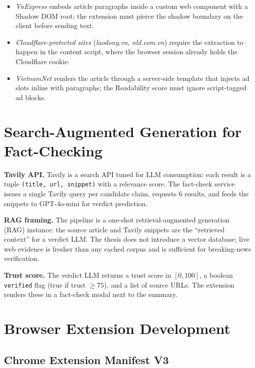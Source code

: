 \begin{itemize}
  \item \textit{VnExpress} embeds article paragraphs inside a custom
        web component with a Shadow DOM root; the extension must pierce
        the shadow boundary on the client before sending text.
  \item \textit{Cloudflare-protected sites} (\textit{laodong.vn},
        \textit{nld.com.vn}) require the extraction to happen in the
        content script, where the browser session already holds the
        Cloudflare cookie.
  \item \textit{VietnamNet} renders the article through a server-side
        template that injects ad slots inline with paragraphs; the
        Readability score must ignore script-tagged ad blocks.
\end{itemize}

\section{Search-Augmented Generation for Fact-Checking}

\textbf{Tavily API.} Tavily is a search API tuned for LLM consumption:
each result is a tuple \texttt{(title, url, snippet)} with a relevance
score. The fact-check service issues a single Tavily query per candidate
claim, requests $6$ results, and feeds the snippets to GPT-4o-mini for
verdict prediction.

\textbf{RAG framing.} The pipeline is a one-shot retrieval-augmented
generation (RAG) instance: the source article and Tavily snippets are the
``retrieved context'' for a verdict LLM. The thesis does not introduce a
vector database; live web evidence is fresher than any cached corpus and is
sufficient for breaking-news verification.

\textbf{Trust score.} The verdict LLM returns a trust score in $[0, 100]$,
a boolean \texttt{verified} flag (true if trust $\geq 75$), and a list of
source URLs. The extension renders these in a fact-check modal next to the
summary.

\section{Browser Extension Development}

\subsection{Chrome Extension Manifest V3}

